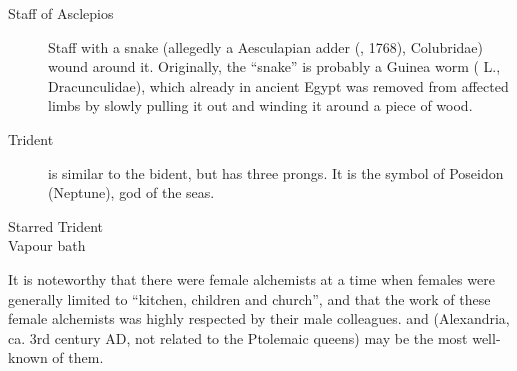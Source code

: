 \documentclass[notitlepage,british]{scrartcl}
\begin{document}
\begin{refsection}
\begin{description}
  \item[Staff of Asclepios]{Staff with a snake (allegedly a Aesculapian adder  (, 1768), Colubridae)  wound around it. Originally, the ``snake'' is probably a Guinea worm ( L., Dracunculidae), which already in ancient Egypt was removed from affected limbs by slowly pulling it out and winding it around a piece of wood. }
  \item[Trident ]{is similar to the bident, but has three prongs. It is the symbol of Poseidon (Neptune), god of the seas. }
  \item[Starred Trident ]{}
  \item[Vapour bath ]{}
\end{description}

It is noteworthy that there were female alchemists at a time when females were generally limited to ``kitchen, children and church'', and that the work of these female alchemists was highly respected by their male colleagues.  and  (Alexandria, ca. 3rd century AD, not related to the Ptolemaic queens) may be the most well-known of them.


\end{refsection}
\end{document}
